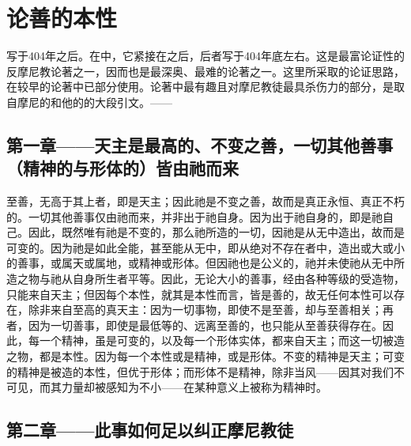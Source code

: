 
\chapter{论善的本性}


写于404年之后。在中，它紧接在之后，后者写于404年底左右。这是最富论证性的反摩尼教论著之一，因而也是最深奥、最难的论著之一。这里所采取的论证思路，在较早的论著中已部分使用。论著中最有趣且对摩尼教徒最具杀伤力的部分，是取自摩尼的和他的的大段引文。——\par


\section{第一章——天主是最高的、不变之善，一切其他善事（精神的与形体的）皆由祂而来}

至善，无高于其上者，即是天主；因此祂是不变之善，故而是真正永恒、真正不朽的。一切其他善事仅由祂而来，并非出于祂自身。因为出于祂自身的，即是祂自己。因此，既然唯有祂是不变的，那么祂所造的一切，因祂是从无中造出，故而是可变的。因为祂是如此全能，甚至能从无中，即从绝对不存在者中，造出或大或小的善事，或属天或属地，或精神或形体。但因祂也是公义的，祂并未使祂从无中所造之物与祂从自身所生者平等。因此，无论大小的善事，经由各种等级的受造物，只能来自天主；但因每个本性，就其是本性而言，皆是善的，故无任何本性可以存在，除非来自至高的真天主：因为一切事物，即使不是至善，却与至善相关；再者，因为一切善事，即使是最低等的、远离至善的，也只能从至善获得存在。因此，每一个精神，虽是可变的，以及每一个形体实体，都来自天主；而这一切被造之物，都是本性。因为每一个本性或是精神，或是形体。不变的精神是天主；可变的精神是被造的本性，但优于形体；而形体不是精神，除非当风——因其对我们不可见，而其力量却被感知为不小——在某种意义上被称为精神时。\par


\section{第二章——此事如何足以纠正摩尼教徒}

